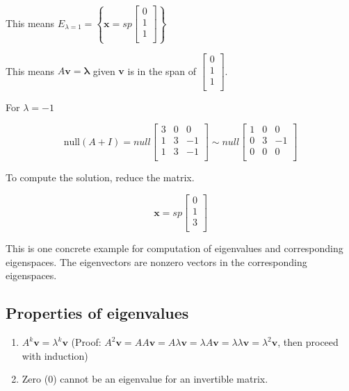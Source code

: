 \documentclass[
]{article}
\newcounter{example}
\begin{document}
This means
$E_{\lambda = 1} = \left\{ \mathbf{x} = sp\begin{bmatrix}
0 \\
1 \\
1 \\
\end{bmatrix} \right\}$

This means $A\mathbf{v} = \mathbf{\lambda}$ given
$\mathbf{v}$ is in the span of $\begin{bmatrix}
0 \\
1 \\
1 \\
\end{bmatrix}$.

For $\lambda = - 1$

$$\text{null}(A + I) = null\begin{bmatrix}
3 & 0 & 0 \\
1 & 3 & - 1 \\
1 & 3 & - 1 \\
\end{bmatrix}\sim null\begin{bmatrix}
1 & 0 & 0 \\
0 & 3 & - 1 \\
0 & 0 & 0 \\
\end{bmatrix}$$

To compute the solution, reduce the matrix.

$$\mathbf{x} = sp\begin{bmatrix}
0 \\
1 \\
3 \\
\end{bmatrix}$$

This is one concrete example for computation of eigenvalues and
corresponding eigenspaces. The eigenvectors are nonzero vectors in the
corresponding eigenspaces.


\subsection{Properties of eigenvalues}

\begin{enumerate}
\def\labelenumi{\arabic{enumi}.}
\item
  $A^{k}\mathbf{v} = \lambda^{k}\mathbf{v}$ (Proof:
  $A^{2}\mathbf{v} = AA\mathbf{v} = A\lambda\mathbf{v} = \lambda A\mathbf{v} = \lambda\lambda\mathbf{v} = \lambda^{2}\mathbf{v}$,
  then proceed with induction)
\item
  Zero (0) cannot be an eigenvalue for an invertible matrix.
\end{enumerate}
\end{document}
